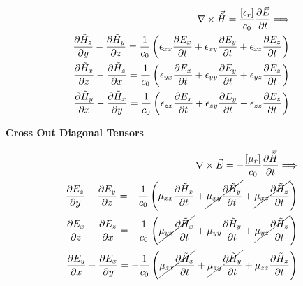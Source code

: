 \documentclass[a4paper,10pt]{article}
\begin{document}
\begin{align}
  \nabla \times \vec{\tilde{H}} =  \frac{[\epsilon_r]}{c_0}\frac{\partial \vec{E}}{\partial t}
  \Longrightarrow\\
  \frac{\partial \tilde{H}_z}{\partial y} - \frac{\partial \tilde{H}_y}{\partial z} = \frac{1}{c_0}\left(\epsilon_{xx} \frac{\partial E_x}{\partial t} + \epsilon_{xy} \frac{\partial E_y}{\partial t} + \epsilon_{xz} \frac{\partial E_z}{\partial t}\right)\notag\\
  \frac{\partial \tilde{H}_x}{\partial z} - \frac{\partial \tilde{H}_z}{\partial x} = \frac{1}{c_0}\left(\epsilon_{yx} \frac{\partial E_x}{\partial t} + \epsilon_{yy} \frac{\partial E_y}{\partial t} + \epsilon_{yz} \frac{\partial E_z}{\partial t}\right)\notag\\
  \frac{\partial \tilde{H}_y}{\partial x} - \frac{\partial \tilde{H}_x}{\partial y} = \frac{1}{c_0}\left(\epsilon_{zx} \frac{\partial E_x}{\partial t} + \epsilon_{zy} \frac{\partial E_y}{\partial t} + \epsilon_{zz} \frac{\partial E_z}{\partial t}\right)\notag
\end{align}


\textbf{Cross Out Diagonal Tensors}

\begin{align}
  \nabla \times \vec{E} = -\frac{[\mu_r]}{c_0}\frac{\partial \vec{\tilde{H}}}{\partial t}
  \Longrightarrow\\
  \frac{\partial E_z}{\partial y} - \frac{\partial E_y}{\partial z} = -\frac{1}{c_0}\left(\mu_{xx} \frac{\partial\tilde{H}_x}{\partial t} + \cancel{\mu_{xy}\frac{\partial\tilde{H}_y}{\partial t}} + \cancel{\mu_{xz} \frac{\partial\tilde{H}_z}{\partial t}}\right)\notag\\
  \frac{\partial E_x}{\partial z} - \frac{\partial E_z}{\partial x} = -\frac{1}{c_0}\left(\cancel{\mu_{yx} \frac{\partial\tilde{H}_x}{\partial t}} + \mu_{yy} \frac{\partial\tilde{H}_y}{\partial t} + \cancel{\mu_{yz} \frac{\partial\tilde{H}_z}{\partial t}}\right)\notag\\
  \frac{\partial E_y}{\partial x} - \frac{\partial E_x}{\partial y} = -\frac{1}{c_0}\left(\cancel{\mu_{zx} \frac{\partial\tilde{H}_x}{\partial t}} + \cancel{\mu_{zy} \frac{\partial\tilde{H}_y}{\partial t}} + \mu_{zz} \frac{\partial\tilde{H}_z}{\partial t}\right)\notag
\end{align}
\end{document}
